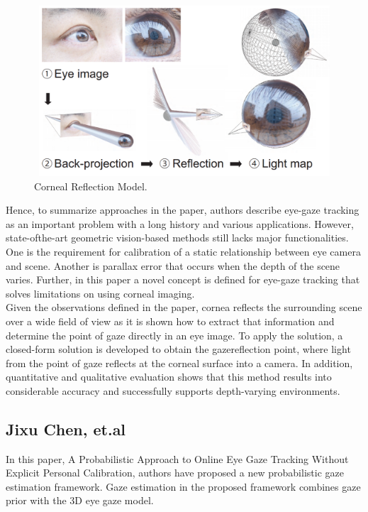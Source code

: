 \begin{figure}[!hbt]
  \centering
  \includegraphics[width=4.5in,height=2.5in]{chrisitanN2.png}
  \caption{Corneal Reflection Model.}
  \label{christian}
\end{figure}


Hence, to summarize approaches in the paper, authors describe eye-gaze tracking as an important problem with a long history and various applications. However, state-ofthe-art geometric vision-based methods still lacks major functionalities. One is the requirement for calibration of a static relationship between eye camera and scene. Another is parallax error that occurs when the depth of the scene varies. Further, in this paper a novel concept is defined for eye-gaze tracking that solves limitations on using corneal imaging.\\

Given the observations defined in the paper, cornea reflects the surrounding scene over a wide field of view as it is shown how to extract that information and determine the point of gaze directly in an eye image. To apply the solution, a closed-form solution is developed to obtain the gazereflection point, where light from the point of gaze reflects at the corneal surface into a camera. In addition, quantitative and qualitative evaluation shows that this method results into considerable accuracy and successfully supports depth-varying environments.

\subsection{Jixu Chen, et.al \cite{21}}

In this paper, A Probabilistic Approach to Online Eye Gaze Tracking Without Explicit Personal Calibration, authors have proposed a new probabilistic gaze estimation framework. Gaze estimation in the proposed framework combines gaze prior with the 3D eye gaze model.

